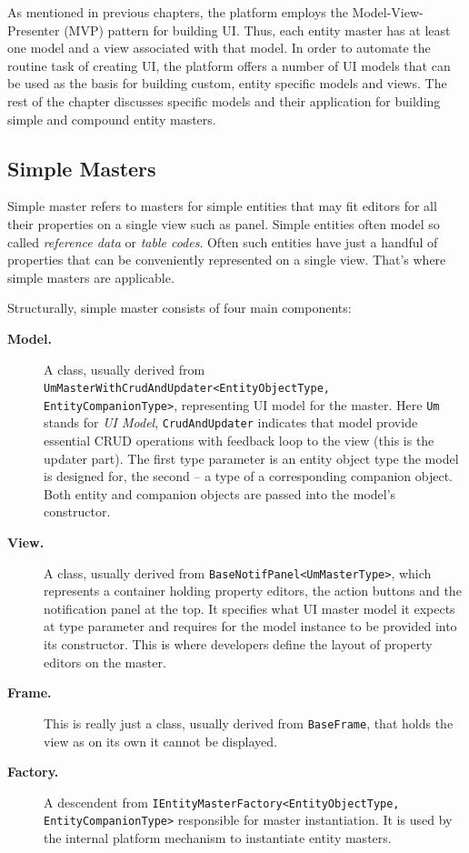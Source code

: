   As mentioned in previous chapters, the platform employs the Model-View-Presenter (MVP) pattern for building UI.
  Thus, each entity master has at least one model and a view associated with that model.  
  In order to automate the routine task of creating UI, the platform offers a number of UI models that can be used as the basis for building custom, entity specific models and views.
  The rest of the chapter discusses specific models and their application for building simple and compound entity masters.
  
\subsection{Simple Masters}
  Simple master refers to masters for simple entities that may fit editors for all their properties on a single view such as panel.
  Simple entities often model so called \emph{reference data} or \emph{table codes}.
  Often such entities have just a handful of properties that can be conveniently represented on a single view.
  That's where simple masters are applicable.
  
  Structurally, simple master consists of four main components:
  
  \begin{description}
   \item[\textbf{Model.}] A class, usually derived from \texttt{UmMasterWithCrudAndUpdater<EntityObjectType, EntityCompanionType>}, representing UI model for the master.
   Here \texttt{Um} stands for \emph{UI Model}, \texttt{CrudAndUpdater} indicates that model provide essential CRUD operations with feedback loop to the view (this is the updater part).
   The first type parameter is an entity object type the model is designed for, the second -- a type of a corresponding companion object.
   Both entity and companion objects are passed into the model's constructor.
   \item[\textbf{View.}] A class, usually derived from \texttt{BaseNotifPanel<UmMasterType>}, which represents a container holding property editors, the action buttons and the notification panel at the top. 
   It specifies what UI master model it expects at type parameter and requires for the model instance to be provided into its constructor. 
   This is where developers define the layout of property editors on the master.
   \item[\textbf{Frame.}] This is really just a class, usually derived from \texttt{BaseFrame}, that holds the view as on its own it cannot be displayed.   
   \item[\textbf{Factory.}] A descendent from \texttt{IEntityMasterFactory<Entity\-Object\-Type, Entity\-Companion\-Type>} responsible for master instantiation.   
   It is used by the internal platform mechanism to instantiate entity masters.
  \end{description}
  

